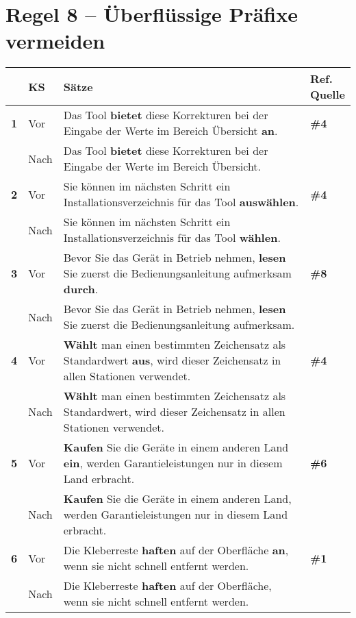 \section*{Regel 8 -- Überflüssige Präfixe vermeiden}


\begin{longtable}{llp{}l}

\lsptoprule
{} & \textbf{KS} & \textbf{Sätze} & \makecell[tl]{\textbf{Ref.}\\\textbf{Quelle}}\\
\midrule
{ \textbf{1}} & Vor & Das Tool \textbf{bietet} diese Korrekturen bei der Eingabe der Werte im Bereich Übersicht \textbf{an}. & \textbf{\#4}\\
& Nach & Das Tool \textbf{bietet} diese Korrekturen bei der Eingabe der Werte im Bereich Übersicht. & \\
\tablevspace
{ \textbf{2}} & Vor & Sie können im nächsten Schritt ein Installationsverzeichnis für das Tool \textbf{auswählen}. & \textbf{\#4}\\
& Nach & Sie können im nächsten Schritt ein Installationsverzeichnis für das Tool \textbf{wählen}. & \\
\tablevspace
{ \textbf{3}} & Vor & Bevor Sie das Gerät in Betrieb nehmen, \textbf{lesen} Sie zuerst die Bedienungsanleitung aufmerksam \textbf{durch}. & \textbf{\#8}\\
& Nach & Bevor Sie das Gerät in Betrieb nehmen, \textbf{lesen} Sie zuerst die Bedienungsanleitung aufmerksam. & \\
\tablevspace
{ \textbf{4}} & Vor & \textbf{Wählt} man einen bestimmten Zeichensatz als Standardwert \textbf{aus}, wird dieser Zeichensatz in allen Stationen verwendet. & \textbf{\#4}\\
& Nach & \textbf{Wählt} man einen bestimmten Zeichensatz als Standardwert, wird dieser Zeichensatz in allen Stationen verwendet. & \\
\tablevspace
{ \textbf{5}} & Vor & \textbf{Kaufen} Sie die Geräte in einem anderen Land \textbf{ein}, werden Garantieleistungen nur in diesem Land erbracht. & \textbf{\#6}\\
& Nach & \textbf{Kaufen} Sie die Geräte in einem anderen Land, werden Garantieleistungen nur in diesem Land erbracht. & \\
\tablevspace
{ \textbf{6}} & Vor & Die Kleberreste \textbf{haften} auf der Oberfläche \textbf{an}, wenn sie nicht schnell entfernt werden. & \textbf{\#1}\\
& Nach & Die Kleberreste \textbf{haften} auf der Oberfläche, wenn sie nicht schnell entfernt werden. & \\

\end{longtable}
